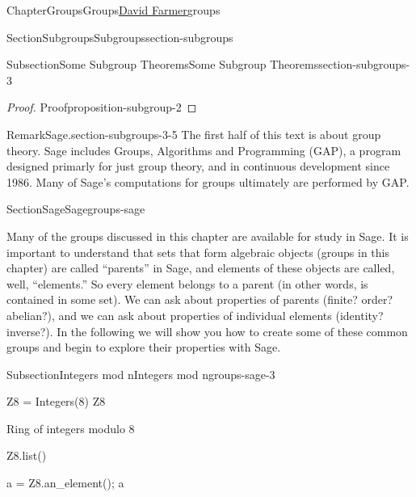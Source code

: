 \documentclass[oneside,10pt,]{book}
\numberwithin{equation}{section}
\begin{document}
\begin{chapterptx}{Chapter}{Groups}{}{Groups}{\hyperlink{dfarmer}{David Farmer}}{}{groups}
\begin{sectionptx}{Section}{Subgroups}{}{Subgroups}{}{}{section-subgroups}
\begin{subsectionptx}{Subsection}{Some Subgroup Theorems}{}{Some Subgroup Theorems}{}{}{section-subgroups-3}
\begin{proof}{Proof}{}{proposition-subgroup-2}
\end{proof}
\begin{remark}{Remark}{Sage.}{section-subgroups-3-5}%
The first half of this text is about group theory.  Sage includes Groups, Algorithms and Programming (GAP), a program designed primarly for just group theory, and in continuous development since 1986.  Many of Sage's computations for groups ultimately are performed by GAP.%
\end{remark}
\end{subsectionptx}
\end{sectionptx}
%
%
\typeout{************************************************}
\typeout{************************************************}
%
\begin{sectionptx}{Section}{Sage}{}{Sage}{}{}{groups-sage}
\begin{introduction}{}%
Many of the groups discussed in this chapter are available for study in Sage.  It is important to understand that sets that form algebraic objects (groups in this chapter) are called ``parents'' in Sage, and elements of these objects are called, well, ``elements.''  So every element belongs to a parent (in other words, is contained in some set).  We can ask about properties of parents (finite? order? abelian?), and we can ask about properties of individual elements (identity? inverse?).  In the following we will show you how to create some of these common groups and begin to explore their properties with Sage.%
\end{introduction}%
%
%
\typeout{************************************************}
\typeout{************************************************}
%
\begin{subsectionptx}{Subsection}{Integers mod n}{}{Integers mod n}{}{}{groups-sage-3}
\begin{sageinput}
Z8 = Integers(8)
Z8
\end{sageinput}
\begin{sageoutput}
Ring of integers modulo 8
\end{sageoutput}
\begin{sageinput}
Z8.list()
\end{sageinput}
\begin{sageoutput}
[0, 1, 2, 3, 4, 5, 6, 7]
\end{sageoutput}
\begin{sageinput}
a = Z8.an_element(); a
\end{sageinput}
\begin{sageoutput}

\end{sageoutput}
\end{subsectionptx}
\end{sectionptx}
\end{chapterptx}
\end{document}
